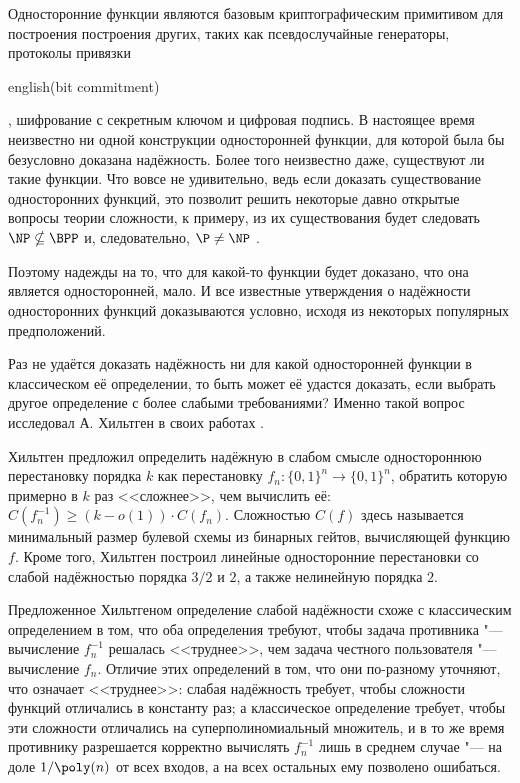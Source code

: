 \documentclass[a4paper, 14pt]{extarticle}
\begin{document}
Односторонние функции являются базовым криптографическим примитивом для
построения построения других, таких как псевдослучайные генераторы, протоколы
привязки \begin{foreignlanguage}{english}(bit commitment)\end{foreignlanguage},
шифрование с секретным ключом и цифровая подпись. В настоящее время неизвестно
ни одной конструкции односторонней функции, для которой была бы безусловно
доказана надёжность. Более того неизвестно даже, существуют ли такие функции.
Что вовсе не удивительно, ведь если доказать существование односторонних
функций, это позволит решить некоторые давно открытые вопросы теории
сложности, к примеру, из их существования будет следовать $\NP \nsubseteq
\BPP$ и, следовательно, $\P \neq \NP$ \cite{goldreich}.

Поэтому надежды на то, что для какой-то функции будет доказано, что она является
односторонней, мало. И все известные утверждения о надёжности односторонних
функций доказываются условно, исходя из некоторых популярных предположений.

Раз не удаётся доказать надёжность ни для какой односторонней функции в
классическом её определении, то быть может её удастся доказать, если выбрать
другое определение с более слабыми требованиями? Именно такой вопрос исследовал
А. Хильтген в своих работах \cite{hiltgen1993,hiltgen1994}.

Хильтген предложил определить надёжную в слабом смысле одностороннюю
перестановку порядка $k$ как перестановку $f_n : \{0, 1\}^n \to \{0, 1\}^n$,
обратить которую примерно в $k$ раз <<сложнее>>, чем вычислить её: $C(f_n^{-1})
\geq (k - o(1)) \cdot C(f_n)$. Сложностью $C(f)$ здесь называется минимальный
размер булевой схемы из бинарных гейтов, вычисляющей функцию $f$. Кроме того,
Хильтген построил линейные односторонние перестановки со слабой надёжностью
порядка $3/2$ и $2$, а также нелинейную порядка $2$.

Предложенное Хильтгеном определение слабой надёжности схоже с классическим
определением в том, что оба определения требуют, чтобы задача противника "---
вычисление $f_n^{-1}$ решалась <<труднее>>, чем задача честного пользователя
"--- вычисление $f_n$. Отличие этих определений в том, что они по-разному
уточняют, что означает <<труднее>>: слабая надёжность требует, чтобы сложности
функций отличались в константу раз; а классическое определение требует, чтобы
эти сложности отличались на суперполиномиальный множитель, и в то же время
противнику разрешается корректно вычислять $f_n^{-1}$ лишь в среднем случае
"--- на доле $1 / \poly(n)$ от всех входов, а на всех остальных ему позволено
ошибаться.
\end{document}
